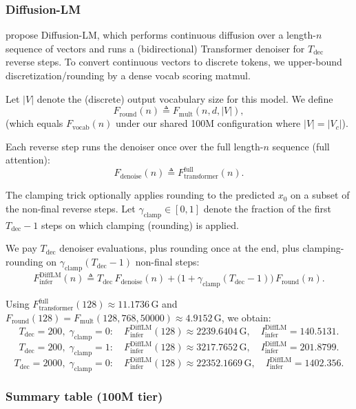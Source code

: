 \documentclass[11pt]{article}
\newcommand{\G}{\mathrm{G}} %
\begin{document}
\subsubsection{Diffusion-LM}
\label{app:diffusionlm_100m}

\citet{li2022diffusionlm} propose Diffusion-LM, which performs continuous diffusion over a length-$n$ sequence of vectors and runs a (bidirectional)
Transformer denoiser for $T_{\text{dec}}$ reverse steps. To convert continuous vectors to discrete tokens,
we upper-bound discretization/rounding by a dense vocab scoring matmul.

Let $|V|$ denote the (discrete) output vocabulary size for this model. We define
\[
F_{\text{round}}(n)\triangleq F_{\text{mult}}(n,d,|V|),
\]
(which equals $F_{\text{vocab}}(n)$ under our shared 100M configuration where $|V|=|V_c|$).

Each reverse step runs the denoiser once over the full length-$n$ sequence (full attention):
\[
F_{\text{denoise}}(n)\triangleq F_{\text{transformer}}^{\text{full}}(n).
\]

The clamping trick optionally applies rounding to the predicted $x_0$ on a subset of the
non-final reverse steps. Let $\gamma_{\text{clamp}}\in[0,1]$ denote the fraction of the first
$T_{\text{dec}}-1$ steps on which clamping (rounding) is applied.

We pay $T_{\text{dec}}$ denoiser evaluations, plus rounding once at the end, plus clamping-rounding on
$\gamma_{\text{clamp}}(T_{\text{dec}}-1)$ non-final steps:
\[
F_{\text{infer}}^{\text{DiffLM}}(n)
\triangleq
T_{\text{dec}}\,F_{\text{denoise}}(n)
+
\Big(1+\gamma_{\text{clamp}}(T_{\text{dec}}-1)\Big)\,F_{\text{round}}(n).
\]

Using $F_{\text{transformer}}^{\text{full}}(128)\approx \num{11.1736}\,\G$ and
$F_{\text{round}}(128)=F_{\text{mult}}(128,768,50000)\approx \num{4.9152}\,\G$, we obtain:
\[
T_{\text{dec}}=200,\;\gamma_{\text{clamp}}=0:\quad
F_{\text{infer}}^{\text{DiffLM}}(128)\approx \num{2239.6404}\,\G,
\quad
I_{\text{infer}}^{\text{DiffLM}}=\num{140.5131}.
\]
\[
T_{\text{dec}}=200,\;\gamma_{\text{clamp}}=1:\quad
F_{\text{infer}}^{\text{DiffLM}}(128)\approx \num{3217.7652}\,\G,
\quad
I_{\text{infer}}^{\text{DiffLM}}=\num{201.8799}.
\]
\[
T_{\text{dec}}=2000,\;\gamma_{\text{clamp}}=0:\quad
F_{\text{infer}}^{\text{DiffLM}}(128)\approx \num{22352.1669}\,\G,
\quad
I_{\text{infer}}^{\text{DiffLM}}=\num{1402.356}.
\]

\subsubsection{Summary table (100M tier)}
\label{app:diff_family_table_100m}
\end{document}
